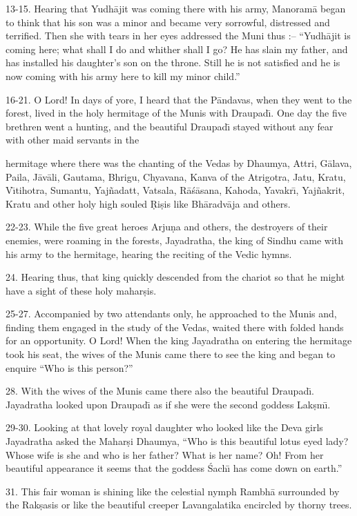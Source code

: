 13-15. Hearing that Yudh\=ajit was coming there with his army, Manoram\=a began to think that his son was a minor and became very sorrowful, distressed and terrified. Then she with tears in her eyes addressed the Muni thus :-- ``Yudh\=ajit is coming here; what shall I do and whither shall I go? He has slain my father, and has installed his daughter's son on the throne. Still he is not satisfied and he is now coming with his army here to kill my minor child.''

16-21. O Lord! In days of yore, I heard that the P\=andavas, when they went to the forest, lived in the holy hermitage of the Munis with Draupad\={\i}. One day the five brethren went a hunting, and the beautiful Draupad\={\i} stayed without any fear with other maid servants in the

hermitage where there was the chanting of the Vedas by Dhaumya, Attri, G\=alava, Paila, J\=av\=ali, Gautama, Bhrigu, Chyavana, Kanva of the Atrigotra, Jatu, Kratu, V\={\i}tihotra, Sumantu, Yaj\~nadatt, Vatsala, R\=a\'s\=asana, Kahoda, Yavakr\={\i}, Yaj\~nakrit, Kratu and other holy high souled \d{R}i\d{s}is like Bh\=aradv\=aja and others.

22-23. While the five great heroes Arju\d{n}a and others, the destroyers of their enemies, were roaming in the forests, Jayadratha, the king of Sindhu came with his army to the hermitage, hearing the reciting of the Vedic hymns.

24. Hearing thus, that king quickly descended from the chariot so that he might have a sight of these holy mahar\d{s}is.

25-27. Accompanied by two attendants only, he approached to the Munis and, finding them engaged in the study of the Vedas, waited there with folded hands for an opportunity. O Lord! When the king Jayadratha on entering the hermitage took his seat, the wives of the Munis came there to see the king and began to enquire ``Who is this person?''

28. With the wives of the Munis came there also the beautiful Draupad\={\i}. Jayadratha looked upon Draupad\={\i} as if she were the second goddess Lak\d{s}m\={\i}.

29-30. Looking at that lovely royal daughter who looked like the Deva girls Jayadratha asked the Mahar\d{s}i Dhaumya, ``Who is this beautiful lotus eyed lady? Whose wife is she and who is her father? What is her name? Oh! From her beautiful appearance it seems that the goddess \'Sach\={\i} has come down on earth.''

31. This fair woman is shining like the celestial nymph Rambh\=a surrounded by the Rak\d{s}asis or like the beautiful creeper Lavangalatika encircled by thorny trees.

